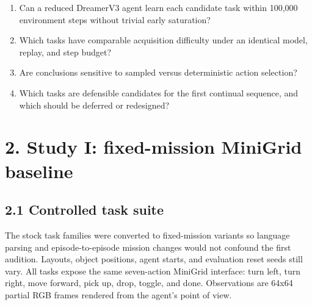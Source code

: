 \documentclass[10pt,a4paper]{article}
\newcommand{\reportsection}[1]{\section{#1}}
\newcommand{\reportsubsection}[1]{\subsection{\textcolor{brandblue}{#1}}}
\begin{document}
\begin{enumerate}
\item Can a reduced DreamerV3 agent learn each candidate task within 100,000 environment steps without trivial early saturation?
\item Which tasks have comparable acquisition difficulty under an identical model, replay, and step budget?
\item Are conclusions sensitive to sampled versus deterministic action selection?
\item Which tasks are defensible candidates for the first continual sequence, and which should be deferred or redesigned?
\end{enumerate}
\begin{center}
\end{center}
\reportsection{2. Study I: fixed-mission MiniGrid baseline}
\reportsubsection{2.1 Controlled task suite}
The stock task families were converted to fixed-mission variants so language parsing and episode-to-episode mission changes would not confound the first audition. Layouts, object positions, agent starts, and evaluation reset seeds still vary. All tasks expose the same seven-action MiniGrid interface: turn left, turn right, move forward, pick up, drop, toggle, and done. Observations are 64x64 partial RGB frames rendered from the agent's point of view.
\end{document}
